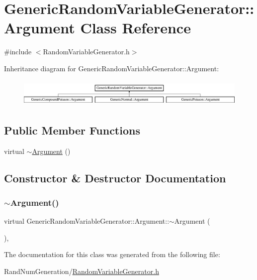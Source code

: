 \hypertarget{class_generic_random_variable_generator_1_1_argument}{}\section{Generic\+Random\+Variable\+Generator\+:\+:Argument Class Reference}
\label{class_generic_random_variable_generator_1_1_argument}


{\ttfamily \#include $<$Random\+Variable\+Generator.\+h$>$}

Inheritance diagram for Generic\+Random\+Variable\+Generator\+:\+:Argument\+:\begin{figure}[H]
\begin{center}
\leavevmode
\includegraphics[height=1.357576cm]{class_generic_random_variable_generator_1_1_argument}
\end{center}
\end{figure}
\subsection*{Public Member Functions}
\begin{DoxyCompactItemize}
\item 
virtual \hyperlink{class_generic_random_variable_generator_1_1_argument_a0f197232f1c7847d3e48f0f1f6ce4607}{$\sim$\+Argument} ()
\end{DoxyCompactItemize}


\subsection{Constructor \& Destructor Documentation}
\hypertarget{class_generic_random_variable_generator_1_1_argument_a0f197232f1c7847d3e48f0f1f6ce4607}{}\label{class_generic_random_variable_generator_1_1_argument_a0f197232f1c7847d3e48f0f1f6ce4607} 
\subsubsection{\texorpdfstring{$\sim$\+Argument()}{~Argument()}}
{\footnotesize\ttfamily virtual Generic\+Random\+Variable\+Generator\+::\+Argument\+::$\sim$\+Argument (\begin{DoxyParamCaption}{ }\end{DoxyParamCaption})\hspace{0.3cm}{\ttfamily [inline]}, {\ttfamily [virtual]}}



The documentation for this class was generated from the following file\+:\begin{DoxyCompactItemize}
\item 
Rand\+Num\+Generation/\hyperlink{_random_variable_generator_8h}{Random\+Variable\+Generator.\+h}\end{DoxyCompactItemize}
